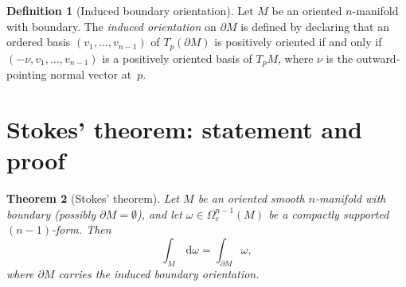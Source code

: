 \documentclass[12pt,a4paper,openany]{book}
\newtheorem{theorem}{Theorem}[section]
\theoremstyle{definition}
\newtheorem{definition}[theorem]{Definition}
\theoremstyle{remark}
\newcommand{\dd}{\,\mathrm{d}}
\begin{document}
\begin{definition}[Induced boundary orientation]\label{def:boundary-orientation}
Let $M$ be an oriented $n$-manifold with boundary.  The
\emph{induced orientation} on $\partial M$ is defined by declaring
that an ordered basis $(v_1,\dots,v_{n-1})$ of $T_p(\partial M)$ is
positively oriented if and only if $(-\nu, v_1,\dots,v_{n-1})$ is a
positively oriented basis of $T_pM$, where $\nu$ is the outward-pointing
normal vector at~$p$.
\end{definition}

\section{Stokes' theorem: statement and proof}\label{sec:stokes-proof}

\begin{theorem}[Stokes' theorem]\label{thm:stokes}
Let $M$ be an oriented smooth $n$-manifold with boundary (possibly
$\partial M = \emptyset$), and let $\omega\in\Omega^{n-1}_c(M)$ be a
compactly supported $(n{-}1)$-form.  Then
\[
  \boxed{\int_M \dd\omega = \int_{\partial M} \omega,}
\]
where $\partial M$ carries the induced boundary orientation.
\end{theorem}
\end{document}
